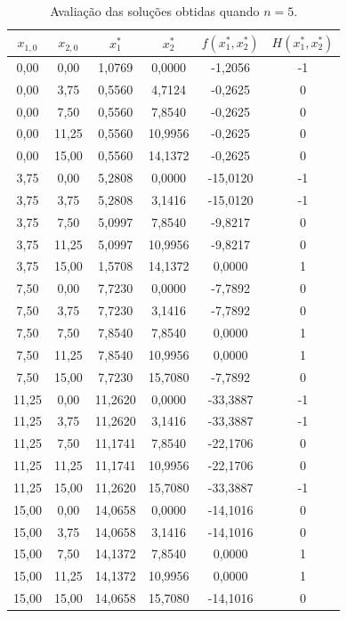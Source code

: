 \documentclass[12pt]{article}
\begin{document}
	\begin{table}[H]
		\centering
		\caption{Avaliação das soluções obtidas quando $ n = 5 $.}
		\label{resultados}
		\begin{tabular}{@{}cccccc@{}}
			\toprule
			$ x_{1,0} $   & $ x_{2,0} $   & $ x_1^* $      & $ x_2^* $      & $ f(x_1^*, x_2^*) $        & $ H(x_1^*, x_2^*) $  \\ \midrule
			0,00  & 0,00  & 1,0769  & 0,0000  & -1,2056  & -1 \\
			0,00  & 3,75  & 0,5560  & 4,7124  & -0,2625  & 0  \\
			0,00  & 7,50  & 0,5560  & 7,8540  & -0,2625  & 0  \\
			0,00  & 11,25 & 0,5560  & 10,9956 & -0,2625  & 0  \\
			0,00  & 15,00 & 0,5560  & 14,1372 & -0,2625  & 0  \\
			3,75  & 0,00  & 5,2808  & 0,0000  & -15,0120 & -1 \\
			3,75  & 3,75  & 5,2808  & 3,1416  & -15,0120 & -1 \\
			3,75  & 7,50  & 5,0997  & 7,8540  & -9,8217  & 0  \\
			3,75  & 11,25 & 5,0997  & 10,9956 & -9,8217  & 0  \\
			3,75  & 15,00 & 1,5708  & 14,1372 & 0,0000   & 1  \\
			7,50  & 0,00  & 7,7230  & 0,0000  & -7,7892  & 0  \\
			7,50  & 3,75  & 7,7230  & 3,1416  & -7,7892  & 0  \\
			7,50  & 7,50  & 7,8540  & 7,8540  & 0,0000   & 1  \\
			7,50  & 11,25 & 7,8540  & 10,9956 & 0,0000   & 1  \\
			7,50  & 15,00 & 7,7230  & 15,7080 & -7,7892  & 0  \\
			11,25 & 0,00  & 11,2620 & 0,0000  & -33,3887 & -1 \\
			11,25 & 3,75  & 11,2620 & 3,1416  & -33,3887 & -1 \\
			11,25 & 7,50  & 11,1741 & 7,8540  & -22,1706 & 0  \\
			11,25 & 11,25 & 11,1741 & 10,9956 & -22,1706 & 0  \\
			11,25 & 15,00 & 11,2620 & 15,7080 & -33,3887 & -1 \\
			15,00 & 0,00  & 14,0658 & 0,0000  & -14,1016 & 0  \\
			15,00 & 3,75  & 14,0658 & 3,1416  & -14,1016 & 0  \\
			15,00 & 7,50  & 14,1372 & 7,8540  & 0,0000   & 1  \\
			15,00 & 11,25 & 14,1372 & 10,9956 & 0,0000   & 1  \\
			15,00 & 15,00 & 14,0658 & 15,7080 & -14,1016 & 0  \\ \bottomrule
		\end{tabular}
	\end{table}
	
\end{document}
